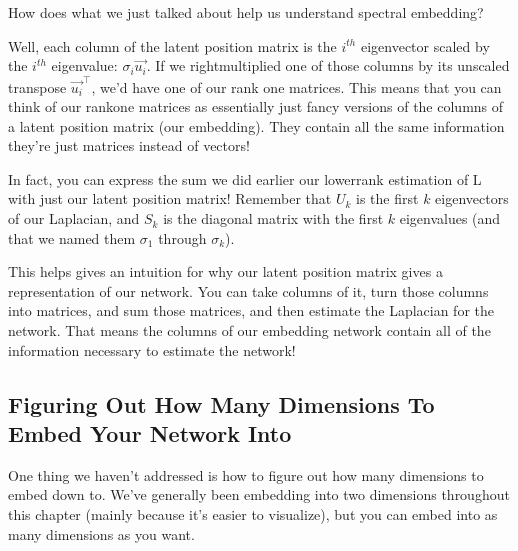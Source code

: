 \documentclass[letterpaper,10pt,english]{jupyterBook}
\begin{document}
\begin{sphinxVerbatim}[commandchars=\\\{\}]
  
  \PYG{p}{[} \PYG{p}{]}
  \PYG{p}{[}\PYG{p}{]}

    
\end{sphinxVerbatim}

\noindent{}

\sphinxAtStartPar
How does what we just talked about help us understand spectral embedding?

\sphinxAtStartPar
Well, each column of the latent position matrix is the \(i^{th}\) eigenvector scaled by the \(i^{th}\) eigenvalue: \(\sigma_i \vec{u_i}\). If we right\sphinxhyphen{}multiplied one of those columns by its unscaled transpose \(\vec{u_i}^\top\), we’d have one of our rank one matrices. This means that you can think of our rank\sphinxhyphen{}one matrices as essentially just fancy versions of the columns of a latent position matrix (our embedding). They contain all the same information \sphinxhyphen{} they’re just matrices instead of vectors!

\noindent{}

\sphinxAtStartPar
In fact, you can express the sum we did earlier \sphinxhyphen{} our lower\sphinxhyphen{}rank estimation of L \sphinxhyphen{} with just our latent position matrix! Remember that \(U_k\) is the first \(k\) eigenvectors of our Laplacian, and \(S_k\) is the diagonal matrix with the first \(k\) eigenvalues (and that we named them \(\sigma_1\) through \(\sigma_k\)).

\noindent{}

\sphinxAtStartPar
This helps gives an intuition for why our latent position matrix gives a representation of our network. You can take columns of it, turn those columns into matrices, and sum those matrices, and then estimate the Laplacian for the network. That means the columns of our embedding network contain all of the information necessary to estimate the network!


\subsection{Figuring Out How Many Dimensions To Embed Your Network Into}
\label{\detokenize{representations/ch6/spectral-embedding:figuring-out-how-many-dimensions-to-embed-your-network-into}}
\sphinxAtStartPar
One thing we haven’t addressed is how to figure out how many dimensions to embed down to. We’ve generally been embedding into two dimensions throughout this chapter (mainly because it’s easier to visualize), but you can embed into as many dimensions as you want.
\end{document}
